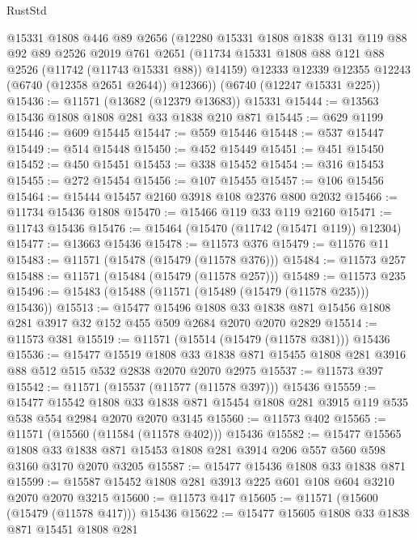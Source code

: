 \begin{lexlean}{RustStd}
\begin{coremodule}
      @15331
      @1808
      @446
      @89
      @2656
      (@12280
        @15331
        @1808
        @1838
        @131
        @119
        @88
        @92
        @89
        @2526
        @2019
        @761
        @2651
        (@11734 @15331 @1808 @88 @121 @88 @2526 (@11742 (@11743 @15331 @88)) @14159)
        @12333
        @12339
        @12355
        @12243
        (@6740 (@12358 @2651 @2644))
        @12366))
    (@6740 (@12247 @15331 @225))
@15436 := @11571 (@13682 (@12379 @13683)) @15331
@15444 := @13563 @15436 @1808 @1808 @281 @33 @1838 @210 @871
@15445 := @629 @1199
@15446 := @609 @15445
@15447 := @559 @15446
@15448 := @537 @15447
@15449 := @514 @15448
@15450 := @452 @15449
@15451 := @451 @15450
@15452 := @450 @15451
@15453 := @338 @15452
@15454 := @316 @15453
@15455 := @272 @15454
@15456 := @107 @15455
@15457 := @106 @15456
@15464 := @15444 @15457 @2160 @3918 @108 @2376 @800 @2032
@15466 := @11734 @15436 @1808
@15470 := @15466 @119 @33 @119 @2160
@15471 := @11743 @15436
@15476 := @15464 (@15470 (@11742 (@15471 @119)) @12304)
@15477 := @13663 @15436
@15478 := @11573 @376
@15479 := @11576 @11
@15483 := @11571 (@15478 (@15479 (@11578 @376)))
@15484 := @11573 @257
@15488 := @11571 (@15484 (@15479 (@11578 @257)))
@15489 := @11573 @235
@15496 := @15483 (@15488 (@11571 (@15489 (@15479 (@11578 @235))) @15436))
@15513 := @15477
    @15496
    @1808
    @33
    @1838
    @871
    @15456
    @1808
    @281
    @3917
    @32
    @152
    @455
    @509
    @2684
    @2070
    @2070
    @2829
@15514 := @11573 @381
@15519 := @11571 (@15514 (@15479 (@11578 @381))) @15436
@15536 := @15477
    @15519
    @1808
    @33
    @1838
    @871
    @15455
    @1808
    @281
    @3916
    @88
    @512
    @515
    @532
    @2838
    @2070
    @2070
    @2975
@15537 := @11573 @397
@15542 := @11571 (@15537 (@11577 (@11578 @397))) @15436
@15559 := @15477
    @15542
    @1808
    @33
    @1838
    @871
    @15454
    @1808
    @281
    @3915
    @119
    @535
    @538
    @554
    @2984
    @2070
    @2070
    @3145
@15560 := @11573 @402
@15565 := @11571 (@15560 (@11584 (@11578 @402))) @15436
@15582 := @15477
    @15565
    @1808
    @33
    @1838
    @871
    @15453
    @1808
    @281
    @3914
    @206
    @557
    @560
    @598
    @3160
    @3170
    @2070
    @3205
@15587 := @15477 @15436 @1808 @33 @1838 @871
@15599 := @15587 @15452 @1808 @281 @3913 @225 @601 @108 @604 @3210 @2070 @2070 @3215
@15600 := @11573 @417
@15605 := @11571 (@15600 (@15479 (@11578 @417))) @15436
@15622 := @15477
    @15605
    @1808
    @33
    @1838
    @871
    @15451
    @1808
    @281

\end{coremodule}
\end{lexlean}
